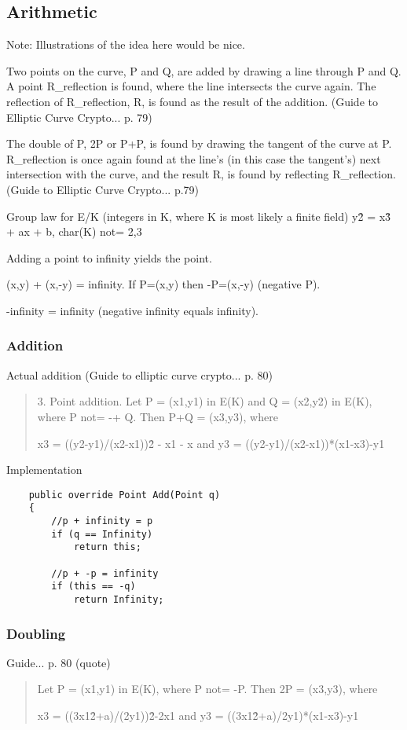 \subsection{Arithmetic}

Note: Illustrations of the idea here would be nice.

Two points on the curve, P and Q, are added by drawing a line through P and Q. A point R\_reflection
is found, where the line intersects the curve again. The reflection of R\_reflection, R, is found as
the result of the addition. (Guide to Elliptic Curve Crypto... p. 79)

The double of P, 2P or P+P, is found by drawing the tangent of the curve at P. R\_reflection is once again found at the line's (in this case the tangent's) next intersection with the curve, and the result R, is found by reflecting R\_reflection. (Guide to Elliptic Curve Crypto... p.79)

Group law for E/K (integers in K, where K is most likely a finite field)
y\^2 = x\^3 + ax + b, char(K) not= 2,3

Adding a point to infinity yields the point.

(x,y) + (x,-y) = infinity. If P=(x,y) then -P=(x,-y) (negative P).

-infinity = infinity (negative infinity equals infinity).

\subsubsection{Addition}

Actual addition (Guide to elliptic curve crypto... p. 80)
\begin{quote}
	3. Point addition. Let P = (x1,y1) in E(K) and Q = (x2,y2) in E(K), where P not= -+ Q.
	Then P+Q = (x3,y3), where
	
	x3 = ((y2-y1)/(x2-x1))\^2 - x1 - x    and    y3 = ((y2-y1)/(x2-x1))*(x1-x3)-y1
\end{quote}

Implementation
\begin{verbatim}
    public override Point Add(Point q)
    {
        //p + infinity = p
        if (q == Infinity)
            return this;

        //p + -p = infinity
        if (this == -q)
            return Infinity;
\end{verbatim}

\subsubsection{Doubling}

Guide... p. 80 (quote)
\begin{quote}
	Let P = (x1,y1) in E(K), where P not= -P. Then 2P = (x3,y3), where
	
	x3 = ((3x1\^2+a)/(2y1))\^2-2x1    and    y3 = ((3x1\^2+a)/2y1)*(x1-x3)-y1
\end{quote}